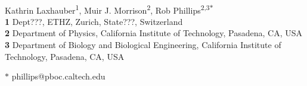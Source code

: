 \documentclass[10pt,letterpaper]{article}
\begin{document}
\vspace*{0.2in}

\begin{flushleft}
	{\Large
		\textbf{} %
	}
	\newline
	\\
	Kathrin Laxhauber\textsuperscript{1},
	Muir J. Morrison\textsuperscript{2},
	Rob Phillips\textsuperscript{2,3$\ast$}
	\\
	\bigskip
	\textbf{1} Dept???, ETHZ, Zurich, State???, Switzerland
	\\
	\textbf{2} Department of Physics, California Institute of Technology, Pasadena, CA, USA
	\\
	\textbf{3} Department of Biology and Biological Engineering, California Institute of Technology, Pasadena, CA, USA
	\\
	\bigskip
	
	
	
	
	$\ast$ phillips@pboc.caltech.edu
	
\end{flushleft}
\end{document}
